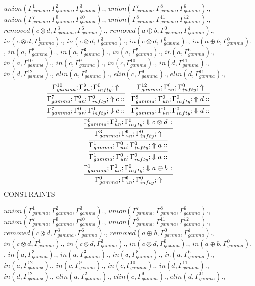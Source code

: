 \documentclass[a4paper, 11pt]{article}
\begin{document}
$union(\Gamma_{gamma}^{1}, \Gamma_{gamma}^{2}, \Gamma_{gamma}^{3}).$, $union(\Gamma_{gamma}^{7}, \Gamma_{gamma}^{8}, \Gamma_{gamma}^{6}).$, $union(\Gamma_{gamma}^{7}, \Gamma_{gamma}^{9}, \Gamma_{gamma}^{10}).$, $union(\Gamma_{gamma}^{8}, \Gamma_{gamma}^{11}, \Gamma_{gamma}^{12}).$, $removed(c \otimes d, \Gamma_{gamma}^{3}, \Gamma_{gamma}^{6}).$, $removed(a \oplus b, \Gamma_{gamma}^{0}, \Gamma_{gamma}^{1}).$, $in(c \otimes d, \Gamma_{gamma}^{1}).$, $in(c \otimes d, \Gamma_{gamma}^{3}).$, $in(c \otimes d, \Gamma_{gamma}^{0}).$, $in(a \oplus b, \Gamma_{gamma}^{0}).$, $in(a, \Gamma_{gamma}^{2}).$, $in(a, \Gamma_{gamma}^{3}).$, $in(a, \Gamma_{gamma}^{7}).$, $in(a, \Gamma_{gamma}^{6}).$, $in(a, \Gamma_{gamma}^{10}).$, $in(c, \Gamma_{gamma}^{9}).$, $in(c, \Gamma_{gamma}^{10}).$, $in(d, \Gamma_{gamma}^{11}).$, $in(d, \Gamma_{gamma}^{12}).$, $elin(a, \Gamma_{gamma}^{2}).$, $elin(c, \Gamma_{gamma}^{9}).$, $elin(d, \Gamma_{gamma}^{11}).$, 
\[
\infer{\Gamma_{ gamma}^{0} ; \Gamma_{un}^{0} ; \Gamma_{ infty}^{0} ;  \Uparrow }
{\infer{\Gamma_{ gamma}^{1} ; \Gamma_{un}^{0} ; \Gamma_{ infty}^{0} ;  \Downarrow a \oplus b :: }
{\infer{\Gamma_{ gamma}^{1} ; \Gamma_{un}^{0} ; \Gamma_{ infty}^{0} ;  \Downarrow a :: }
{\infer{\Gamma_{ gamma}^{1} ; \Gamma_{un}^{0} ; \Gamma_{ infty}^{0} ;  \Uparrow a :: }
{\infer{\Gamma_{ gamma}^{3} ; \Gamma_{un}^{0} ; \Gamma_{ infty}^{0} ;  \Uparrow }
{\infer{\Gamma_{ gamma}^{6} ; \Gamma_{un}^{0} ; \Gamma_{ infty}^{0} ;  \Downarrow c \otimes d :: }
{\infer{\Gamma_{ gamma}^{7} ; \Gamma_{un}^{0} ; \Gamma_{ infty}^{0} ;  \Downarrow c :: }
{\infer{\Gamma_{ gamma}^{7} ; \Gamma_{un}^{0} ; \Gamma_{ infty}^{0} ;  \Uparrow c :: }
{\Gamma_{ gamma}^{10} ; \Gamma_{un}^{0} ; \Gamma_{ infty}^{0} ;  \Uparrow }}
&
\infer{\Gamma_{ gamma}^{8} ; \Gamma_{un}^{0} ; \Gamma_{ infty}^{0} ;  \Downarrow d :: }
{\infer{\Gamma_{ gamma}^{8} ; \Gamma_{un}^{0} ; \Gamma_{ infty}^{0} ;  \Uparrow d :: }
{\Gamma_{ gamma}^{12} ; \Gamma_{un}^{0} ; \Gamma_{ infty}^{0} ;  \Uparrow }}}}}}}}
\]
CONSTRAINTS

$union(\Gamma_{gamma}^{1}, \Gamma_{gamma}^{2}, \Gamma_{gamma}^{3}).$, $union(\Gamma_{gamma}^{7}, \Gamma_{gamma}^{8}, \Gamma_{gamma}^{6}).$, $union(\Gamma_{gamma}^{7}, \Gamma_{gamma}^{9}, \Gamma_{gamma}^{10}).$, $union(\Gamma_{gamma}^{8}, \Gamma_{gamma}^{11}, \Gamma_{gamma}^{12}).$, $removed(c \otimes d, \Gamma_{gamma}^{3}, \Gamma_{gamma}^{6}).$, $removed(a \oplus b, \Gamma_{gamma}^{0}, \Gamma_{gamma}^{1}).$, $in(c \otimes d, \Gamma_{gamma}^{1}).$, $in(c \otimes d, \Gamma_{gamma}^{3}).$, $in(c \otimes d, \Gamma_{gamma}^{0}).$, $in(a \oplus b, \Gamma_{gamma}^{0}).$, $in(a, \Gamma_{gamma}^{2}).$, $in(a, \Gamma_{gamma}^{3}).$, $in(a, \Gamma_{gamma}^{8}).$, $in(a, \Gamma_{gamma}^{6}).$, $in(a, \Gamma_{gamma}^{12}).$, $in(c, \Gamma_{gamma}^{9}).$, $in(c, \Gamma_{gamma}^{10}).$, $in(d, \Gamma_{gamma}^{11}).$, $in(d, \Gamma_{gamma}^{12}).$, $elin(a, \Gamma_{gamma}^{2}).$, $elin(c, \Gamma_{gamma}^{9}).$, $elin(d, \Gamma_{gamma}^{11}).$, 
\end{document}
